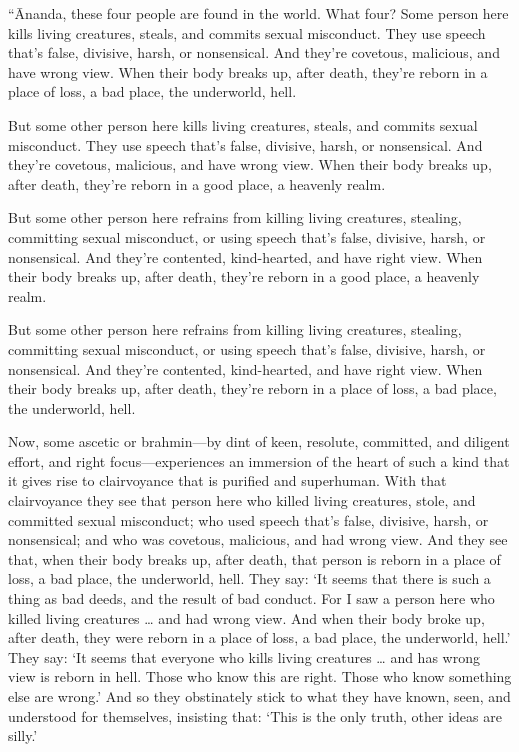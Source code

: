 \documentclass[12pt,openany]{book}%
\begin{document}
“Ānanda, these four people are found in the world. What four? Some person here kills living creatures, steals, and commits sexual misconduct. They use speech that’s false, divisive, harsh, or nonsensical. And they’re covetous, malicious, and have wrong view. When their body breaks up, after death, they’re reborn in a place of loss, a bad place, the underworld, hell. 

But some other person here kills living creatures, steals, and commits sexual misconduct. They use speech that’s false, divisive, harsh, or nonsensical. And they’re covetous, malicious, and have wrong view. When their body breaks up, after death, they’re reborn in a good place, a heavenly realm. 

But some other person here refrains from killing living creatures, stealing, committing sexual misconduct, or using speech that’s false, divisive, harsh, or nonsensical. And they’re contented, kind-hearted, and have right view. When their body breaks up, after death, they’re reborn in a good place, a heavenly realm. 

But some other person here refrains from killing living creatures, stealing, committing sexual misconduct, or using speech that’s false, divisive, harsh, or nonsensical. And they’re contented, kind-hearted, and have right view. When their body breaks up, after death, they’re reborn in a place of loss, a bad place, the underworld, hell. 

Now, some ascetic or brahmin—by dint of keen, resolute, committed, and diligent effort, and right focus—experiences an immersion of the heart of such a kind that it gives rise to clairvoyance that is purified and superhuman. With that clairvoyance they see that person here who killed living creatures, stole, and committed sexual misconduct; who used speech that’s false, divisive, harsh, or nonsensical; and who was covetous, malicious, and had wrong view. And they see that, when their body breaks up, after death, that person is reborn in a place of loss, a bad place, the underworld, hell. They say: ‘It seems that there is such a thing as bad deeds, and the result of bad conduct. For I saw a person here who killed living creatures … and had wrong view. And when their body broke up, after death, they were reborn in a place of loss, a bad place, the underworld, hell.’ They say: ‘It seems that everyone who kills living creatures … and has wrong view is reborn in hell. Those who know this are right. Those who know something else are wrong.’ And so they obstinately stick to what they have known, seen, and understood for themselves, insisting that: ‘This is the only truth, other ideas are silly.’ 
\end{document}
